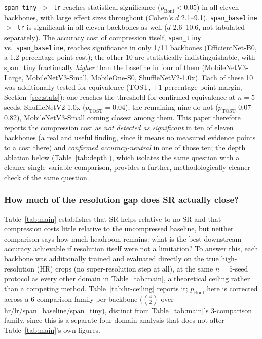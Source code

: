 \documentclass[pdflatex,sn-vancouver-num]{sn-jnl}
\begin{document}
\texttt{span\_tiny $>$ lr} reaches statistical significance ($p_{\text{Bonf}} < 0.05$) in all eleven backbones, with large effect sizes throughout (Cohen's $d$ 2.1--9.1). \texttt{span\_baseline $>$ lr} is significant in all eleven backbones as well ($d$ 2.6--10.6, not tabulated separately). The accuracy cost of compression itself, \texttt{span\_tiny} vs.\ \texttt{span\_baseline}, reaches significance in only 1/11 backbones (EfficientNet-B0, a 1.2-percentage-point cost); the other 10 are statistically indistinguishable, with span\_tiny fractionally \emph{higher} than the baseline in four of them (MobileNetV3-Large, MobileNetV3-Small, MobileOne-S0, ShuffleNetV2-1.0x). Each of these 10 was additionally tested for equivalence (TOST, $\pm 1$ percentage point margin, Section~\ref{sec:stats}): one reaches the threshold for confirmed equivalence at $n=5$ seeds, ShuffleNetV2-1.0x ($p_{\text{TOST}}{=}0.04$); the remaining nine do not ($p_{\text{TOST}}$ 0.07--0.82), MobileNetV3-Small coming closest among them. This paper therefore reports the compression cost as \emph{not detected as significant} in ten of eleven backbones (a real and useful finding, since it means no measured evidence points to a cost there) and \emph{confirmed accuracy-neutral} in one of those ten; the depth ablation below (Table~\ref{tab:depth}), which isolates the same question with a cleaner single-variable comparison, provides a further, methodologically cleaner check of the same question.

\subsubsection{How much of the resolution gap does SR actually close?}
\label{sec:hr-ceiling}

Table~\ref{tab:main} establishes that SR helps relative to no-SR and that compression costs little relative to the uncompressed baseline, but neither comparison says how much headroom remains: what is the best downstream accuracy achievable if resolution itself were not a limitation? To answer this, each backbone was additionally trained and evaluated directly on the true high-resolution (HR) crops (no super-resolution step at all), at the same $n{=}5$-seed protocol as every other domain in Table~\ref{tab:main}, a theoretical ceiling rather than a competing method. Table~\ref{tab:hr-ceiling} reports it; $p_{\text{Bonf}}$ here is corrected across a 6-comparison family per backbone ($\binom{4}{2}$ over hr/lr/span\_baseline/span\_tiny), distinct from Table~\ref{tab:main}'s 3-comparison family, since this is a separate four-domain analysis that does not alter Table~\ref{tab:main}'s own figures.
\end{document}
